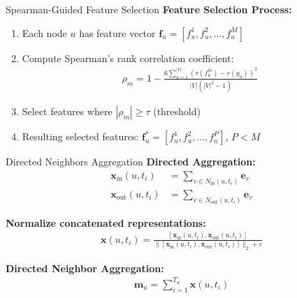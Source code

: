 \documentclass{beamer}
\begin{document}
\begin{frame}{Spearman-Guided Feature Selection}
    \textbf{Feature Selection Process:}
    \begin{enumerate}
        \item Each node $u$ has feature vector $\mathbf{f}_u = [f_u^{1}, f_u^{2}, \dots, f_u^{M}]$
        \item Compute Spearman's rank correlation coefficient:
        \begin{align}
        \rho_m = 1 - \frac{6 \sum_{u=1}^{|V|} (r(f_u^{m}) - r(y_u))^2}{|V|(|V|^2 - 1)}
        \end{align}
        \item Select features where $|\rho_m| \ge \tau$ (threshold)
        \item Resulting selected features: $\mathbf{f}^*_u = [f^{1}_u, f^{2}_u, \dots, f^{P}_u]$, $P < M$
    \end{enumerate}
    
    
\vspace{0.3cm}
\end{frame}

\begin{frame}{Directed Neighbors Aggregation}
    \textbf{Directed Aggregation:}
    \begin{align}
        \mathbf{x}_{\text{in}}(u, t_i) &= \sum_{v \in N_{\text{in}}(u, t_i)} \mathbf{e}_v \\
        \mathbf{x}_{\text{out}}(u, t_i) &= \sum_{v \in N_{\text{out}}(u, t_i)} \mathbf{e}_v
    \end{align}
    
    \textbf{Normalize concatenated representations:}
    \begin{align}
        \mathbf{x}(u, t_i) = \frac{[\mathbf{x}_{\text{in}}(u, t_i), \mathbf{x}_{\text{out}}(u, t_i)]}{\|[\mathbf{x}_{\text{in}}(u, t_i), \mathbf{x}_{\text{out}}(u, t_i)]\|_2 + \epsilon}
    \end{align}
    
    \textbf{Directed Neighbor Aggregation:}
    \begin{align}
        \mathbf{m}_u = \sum_{i=1}^{T_u} \mathbf{x}(u, t_i)
    \end{align}
\end{frame}
\end{document}
